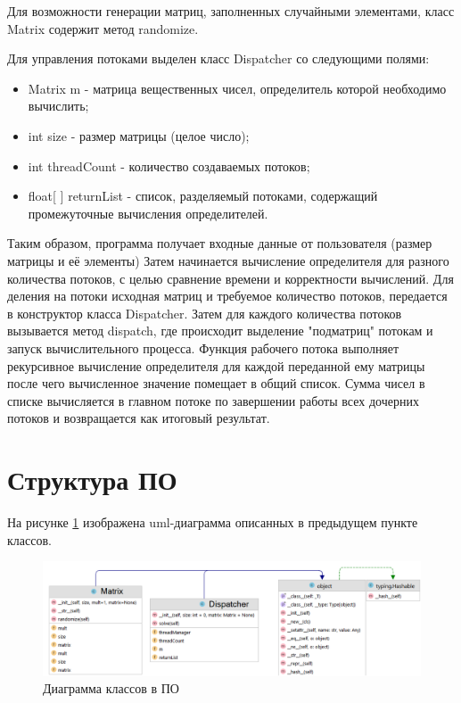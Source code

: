 \documentclass[12pt]{report}
\begin{document}
	Для возможности генерации матриц, заполненных случайными элементами, класс Matrix содержит метод randomize.
	
	Для управления потоками выделен класс Dispatcher со следующими полями:
	\begin{itemize}
		\item Matrix m - матрица вещественных чисел, определитель которой необходимо вычислить;
		\item int size - размер матрицы (целое число);
		\item int threadCount - количество создаваемых потоков;
		\item float{[ ]} returnList - список, разделяемый потоками, содержащий промежуточные вычисления определителей.
	\end{itemize}
	
	Таким образом, программа получает входные данные от пользователя (размер матрицы и её элементы)
	Затем начинается вычисление определителя для разного количества потоков,
	с целью сравнение времени и корректности вычислений.
	Для деления на потоки исходная матриц и требуемое количество потоков, передается в конструктор класса Dispatcher.
	Затем для каждого количества потоков вызывается метод dispatch, где происходит выделение "подматриц" потокам и запуск вычислительного процесса.
	Функция рабочего потока выполняет рекурсивное вычисление определителя для каждой переданной ему матрицы после чего вычисленное значение помещает в общий список.
	Сумма чисел в списке вычисляется в главном потоке по завершении работы всех дочерних потоков и возвращается как итоговый результат.
	
	\section{Структура ПО}
	
	На рисунке \ref{img:uml} изображена uml-диаграмма описанных в предыдущем пункте классов.
	
	\begin{figure}[H]
		\centering
		\includegraphics[width=0.90\linewidth]{img/uml}
		\caption{
			Диаграмма классов в ПО
		}
		\label{img:uml}
	\end{figure}
	
\end{document}
